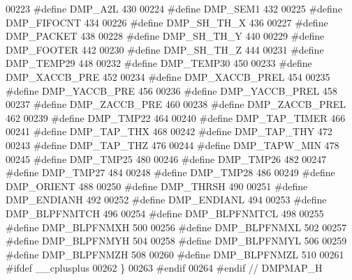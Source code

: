 \begin{DoxyCode}
00223 \textcolor{preprocessor}{#define DMP\_A2L    430}
00224 \textcolor{preprocessor}{#define DMP\_SEM1    432}
00225 \textcolor{preprocessor}{#define DMP\_FIFOCNT    434}
00226 \textcolor{preprocessor}{#define DMP\_SH\_TH\_X    436}
00227 \textcolor{preprocessor}{#define DMP\_PACKET    438}
00228 \textcolor{preprocessor}{#define DMP\_SH\_TH\_Y    440}
00229 \textcolor{preprocessor}{#define DMP\_FOOTER    442}
00230 \textcolor{preprocessor}{#define DMP\_SH\_TH\_Z    444}
00231 \textcolor{preprocessor}{#define DMP\_TEMP29    448}
00232 \textcolor{preprocessor}{#define DMP\_TEMP30    450}
00233 \textcolor{preprocessor}{#define DMP\_XACCB\_PRE    452}
00234 \textcolor{preprocessor}{#define DMP\_XACCB\_PREL    454}
00235 \textcolor{preprocessor}{#define DMP\_YACCB\_PRE    456}
00236 \textcolor{preprocessor}{#define DMP\_YACCB\_PREL    458}
00237 \textcolor{preprocessor}{#define DMP\_ZACCB\_PRE    460}
00238 \textcolor{preprocessor}{#define DMP\_ZACCB\_PREL    462}
00239 \textcolor{preprocessor}{#define DMP\_TMP22    464}
00240 \textcolor{preprocessor}{#define DMP\_TAP\_TIMER    466}
00241 \textcolor{preprocessor}{#define DMP\_TAP\_THX    468}
00242 \textcolor{preprocessor}{#define DMP\_TAP\_THY    472}
00243 \textcolor{preprocessor}{#define DMP\_TAP\_THZ    476}
00244 \textcolor{preprocessor}{#define DMP\_TAPW\_MIN    478}
00245 \textcolor{preprocessor}{#define DMP\_TMP25    480}
00246 \textcolor{preprocessor}{#define DMP\_TMP26    482}
00247 \textcolor{preprocessor}{#define DMP\_TMP27    484}
00248 \textcolor{preprocessor}{#define DMP\_TMP28    486}
00249 \textcolor{preprocessor}{#define DMP\_ORIENT    488}
00250 \textcolor{preprocessor}{#define DMP\_THRSH    490}
00251 \textcolor{preprocessor}{#define DMP\_ENDIANH    492}
00252 \textcolor{preprocessor}{#define DMP\_ENDIANL    494}
00253 \textcolor{preprocessor}{#define DMP\_BLPFNMTCH    496}
00254 \textcolor{preprocessor}{#define DMP\_BLPFNMTCL    498}
00255 \textcolor{preprocessor}{#define DMP\_BLPFNMXH    500}
00256 \textcolor{preprocessor}{#define DMP\_BLPFNMXL    502}
00257 \textcolor{preprocessor}{#define DMP\_BLPFNMYH    504}
00258 \textcolor{preprocessor}{#define DMP\_BLPFNMYL    506}
00259 \textcolor{preprocessor}{#define DMP\_BLPFNMZH    508}
00260 \textcolor{preprocessor}{#define DMP\_BLPFNMZL    510}
00261 \textcolor{preprocessor}{#ifdef \_\_cplusplus}
00262 \}
00263 \textcolor{preprocessor}{#endif}
00264 \textcolor{preprocessor}{#endif // DMPMAP\_H}
\end{DoxyCode}
